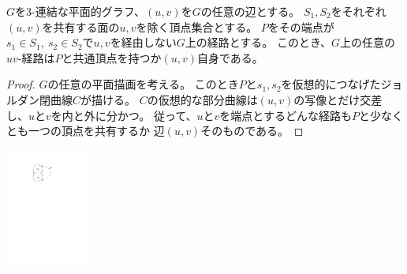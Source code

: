 \begin{paracol}{2}
\begin{lemma}
\label{lemma:tutte_cycle_intersection}
$G$を$3$-連結な平面的グラフ、$(u, v)$を$G$の任意の辺とする。
$S_1, S_2$をそれぞれ$(u, v)$を共有する面の$u, v$を除く頂点集合とする。
$P$をその端点が$s_1 \in S_1,~ s_2 \in S_2$で$u, v$を経由しない$G$上の経路とする。
このとき、$G$上の任意の$uv$-経路は$P$と共通頂点を持つか$(u, v)$自身である。
\end{lemma}


\begin{proof}
$G$の任意の平面描画を考える。
このとき$P$と$s_1, s_2$を仮想的につなげたジョルダン閉曲線$C$が描ける。
$C$の仮想的な部分曲線は$(u, v)$の写像とだけ交差し、$u$と$v$を内と外に分かつ。
従って、$u$と$v$を端点とするどんな経路も$P$と少なくとも一つの頂点を共有するか
辺$(u, v)$そのものである。
\end{proof}
\switchcolumn
\vspace{1.\intextsep}
\centering
\includegraphics[width=0.21\textwidth]{figures/tutte_cycle_intersection.pdf}
\end{paracol}

